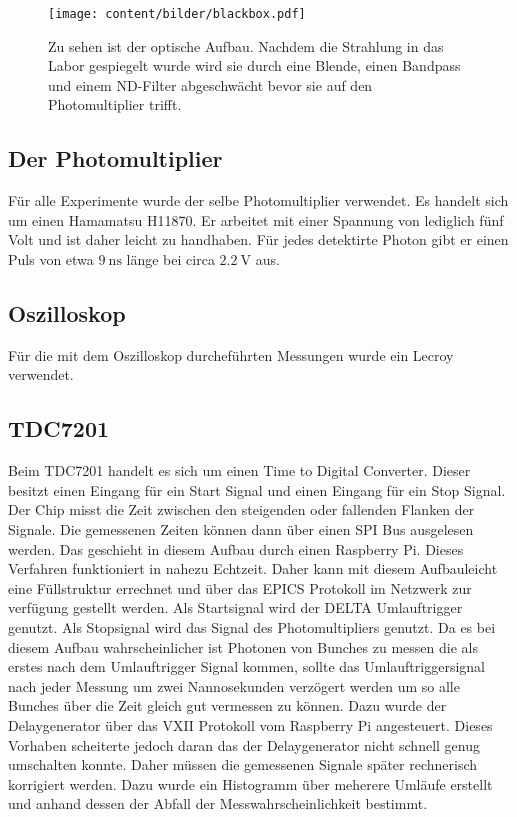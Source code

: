 \begin{figure}
  \centering
  \texttt{[image: content/bilder/blackbox.pdf]}
  \caption{Zu sehen ist der optische Aufbau. Nachdem die Strahlung in das Labor gespiegelt wurde wird sie durch
    eine Blende, einen Bandpass und einem ND-Filter abgeschwächt bevor sie auf den Photomultiplier trifft. }
  \label{fig:blackbox}
\end{figure}


\subsection{Der Photomultiplier}
\label{sec:Photomultiplier}
Für alle Experimente wurde der selbe Photomultiplier verwendet. Es handelt sich um einen Hamamatsu
H11870. Er arbeitet mit einer Spannung von lediglich fünf Volt und ist daher leicht zu handhaben.
Für jedes detektirte Photon gibt er einen Puls von etwa $\SI{9}{\nano\second}$ länge bei circa 
$\SI{2,2}{\volt}$ aus.



\subsection{Oszilloskop}
\label{sec:Oszilloskop}
Für die mit dem Oszilloskop durcheführten Messungen wurde ein Lecroy verwendet. 

\subsection{TDC7201}
\label{sec:TDC}
Beim TDC7201 handelt es sich um einen Time to Digital Converter. Dieser besitzt einen Eingang für ein 
Start Signal und einen Eingang für ein Stop Signal. Der Chip misst die Zeit zwischen den steigenden oder 
fallenden Flanken der Signale. Die gemessenen Zeiten können dann über einen SPI Bus ausgelesen werden.
Das geschieht in diesem Aufbau durch einen Raspberry Pi. Dieses Verfahren funktioniert in nahezu Echtzeit. 
Daher kann mit diesem Aufbauleicht eine Füllstruktur errechnet und über das EPICS Protokoll im Netzwerk 
zur verfügung gestellt werden. Als Startsignal wird der DELTA Umlauftrigger genutzt. Als Stopsignal wird 
das Signal des Photomultipliers genutzt. Da es bei diesem Aufbau wahrscheinlicher ist Photonen von Bunches 
zu messen die als erstes nach dem Umlauftrigger Signal kommen, sollte das Umlauftriggersignal nach jeder 
Messung um zwei Nannosekunden verzögert werden um so alle Bunches über die Zeit gleich gut vermessen zu können.
Dazu wurde der Delaygenerator über das VXII Protokoll vom Raspberry Pi angesteuert.
Dieses Vorhaben scheiterte jedoch daran das der Delaygenerator nicht schnell genug umschalten konnte.
Daher müssen die gemessenen Signale später rechnerisch korrigiert werden. Dazu wurde ein Histogramm über 
meherere Umläufe erstellt und anhand dessen der Abfall der Messwahrscheinlichkeit bestimmt.

